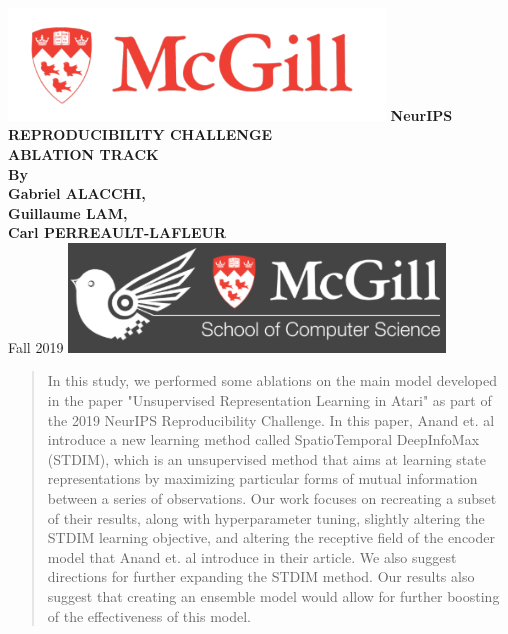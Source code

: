\documentclass{article}
\begin{document}
\begin{titlepage}
    \centering
    \includegraphics[width=10cm]{mcgill}
    \vfill
    \vfill
    {\bfseries\Large
        NeurIPS REPRODUCIBILITY CHALLENGE\\
        ABLATION TRACK\\

        \vskip2cm
        By\\
        Gabriel ALACCHI,\\ 
        Guillaume LAM,\\ 
        Carl PERREAULT-LAFLEUR\\
    }
    \vfill
    Fall 2019
    \vfill
    \vfill
    \vfill
    \vfill
    \vfill
    \includegraphics[width=10cm]{school_cs_mcgill}
\end{titlepage}
\newpage
\begin{abstract}
In this study, we performed some ablations on the main model developed in the paper "Unsupervised Representation Learning in
Atari" \cite{main_article} as part of the 2019 NeurIPS Reproducibility Challenge. In this paper, Anand et. al introduce a new learning method called SpatioTemporal DeepInfoMax (STDIM), which is an unsupervised method that aims at learning state representations by maximizing particular forms of mutual information between a series of observations. Our work focuses on recreating a subset of their results, along with hyperparameter tuning, slightly altering the STDIM learning objective, and altering the receptive field of the encoder model that Anand et. al introduce in their article. We also suggest directions for further expanding the STDIM method. Our results also suggest that creating an ensemble model would allow for further boosting of the effectiveness of this model.

\end{abstract}
\end{document}

